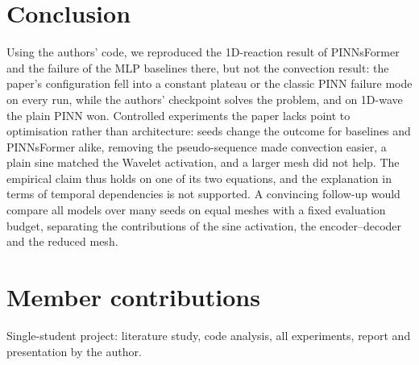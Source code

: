 \documentclass[10pt]{article} %
\begin{document}
\section{Conclusion}
Using the authors' code, we reproduced the 1D-reaction result of PINNsFormer and the failure of the MLP baselines there, but not the convection result: the paper's configuration fell into a constant plateau or the classic PINN failure mode on every run, while the authors' checkpoint solves the problem, and on 1D-wave the plain PINN won. Controlled experiments the paper lacks point to optimisation rather than architecture: seeds change the outcome for baselines and PINNsFormer alike, removing the pseudo-sequence made convection easier, a plain sine matched the Wavelet activation, and a larger mesh did not help. The empirical claim thus holds on one of its two equations, and the explanation in terms of temporal dependencies is not supported. A convincing follow-up would compare all models over many seeds on equal meshes with a fixed evaluation budget, separating the contributions of the sine activation, the encoder--decoder and the reduced mesh.

\section*{Member contributions}
Single-student project: literature study, code analysis, all experiments, report and presentation by the author.






\end{document}
